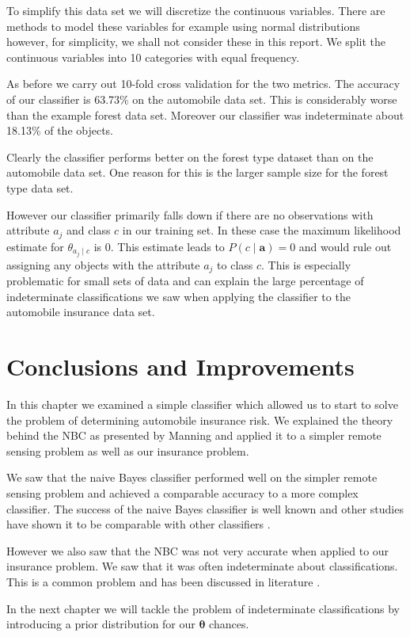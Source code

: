 To simplify this data set we will discretize the continuous variables.
There are methods to model these variables for example using normal distributions \cite{Dumitru09} however, for simplicity, we shall not consider these in this report.
We split the continuous variables into 10 categories with equal frequency.

As before we carry out 10-fold cross validation for the two metrics.
The accuracy of our classifier is 63.73\% on the automobile data set.
This is considerably worse than the example forest data set.
Moreover our classifier was indeterminate about 18.13\% of the objects.

Clearly the classifier performs better on the forest type dataset than on the automobile data set.
One reason for this is the larger sample size for the forest type data set.

However our classifier primarily falls down if there are no observations with attribute $a_j$ and class $c$ in our training set.
In these case the maximum likelihood estimate for $\theta_{a_j \mid c}$ is $0$.
This estimate leads to $P(c \mid \mathbf{a}) = 0$ and would rule out assigning any objects with the attribute $a_j$ to class $c$.
This is especially problematic for small sets of data and can explain the large percentage of indeterminate classifications we saw when applying the classifier to the automobile insurance data set.

\section{Conclusions and Improvements}

In this chapter we examined a simple classifier which allowed us to start to solve the problem of determining automobile insurance risk.
We explained the theory behind the NBC as presented by Manning and applied it to a simpler remote sensing problem as well as our insurance problem.

We saw that the naive Bayes classifier performed well on the simpler remote sensing problem and achieved a comparable accuracy to a more complex classifier.
The success of the naive Bayes classifier is well known and other studies have shown it to be comparable with other classifiers \cite{Dumitru09}.

However we also saw that the NBC was not very accurate when applied to our insurance problem.
We saw that it was often indeterminate about classifications.
This is a common problem and has been discussed in literature \cite{Need}.

In the next chapter we will tackle the problem of indeterminate classifications by introducing a prior distribution for our $\mathbf{\theta}$ chances.